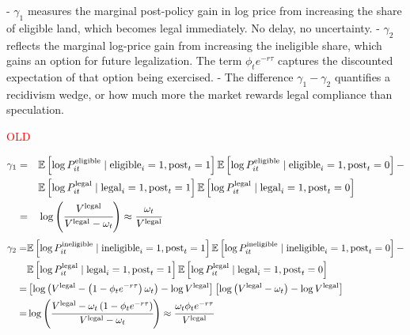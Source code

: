 \documentclass[12pt]{article}
\begin{document}
- $\gamma_1$ measures the marginal post-policy gain in log price from increasing the share of eligible land, which becomes legal immediately. No delay, no uncertainty.
- $\gamma_2$ reflects the marginal log-price gain from increasing the ineligible share, which gains an option for future legalization. The term $\phi_t e^{-r\tau}$ captures the discounted expectation of that option being exercised.
- The difference $\gamma_1 - \gamma_2$ quantifies a recidivism wedge, or how much more the market rewards legal compliance than speculation.

\clearpage

\textcolor{red}{OLD}

\begin{align*}
\gamma_1=&\quad\mathbb{E}\left[\log P_{it}^{\text{eligible}}\mid \text{eligible}_i=1,\text{post}_t=1 \right]\mathbb{E}\left[\log P_{it}^{\text{eligible}}\mid \text{eligible}_i=1,\text{post}_t=0 \right]-\\ 
&\quad \mathbb{E}\left[\log P_{it}^{\text{legal}}\mid \text{legal}_i=1,\text{post}_t=1 \right]\mathbb{E}\left[\log P_{it}^{\text{legal}}\mid \text{legal}_i=1,\text{post}_t=0 \right]\\
=&\quad\log\left(\cfrac{V^{\text{legal}}}{V^{\text{legal}}-\omega_t}\right)\approx\cfrac{\omega_t}{V^{\text{legal}}}
\end{align*}
\begin{align*}
\gamma_2=&\mathbb{E}\left[\log P_{it}^{\text{ineligible}}\mid \text{ineligible}_i=1,\text{post}_t=1 \right]\mathbb{E}\left[\log P_{it}^{\text{ineligible}}\mid \text{ineligible}_i=1,\text{post}_t=0 \right]-\\ 
&\mathbb{E}\left[\log P_{it}^{\text{legal}}\mid \text{legal}_i=1,\text{post}_t=1 \right]\mathbb{E}\left[\log P_{it}^{\text{legal}}\mid \text{legal}_i=1,\text{post}_t=0 \right]\\
=&\left[\log\left(V^{\text{legal}}-\left(1-\phi_t e^{-r\tau}\right)\omega_t\right)-\log V^{\text{legal}}\right]\left[\log\left(V^{\text{legal}}-\omega_t\right)-\log V^{\text{legal}} \right]\\
=&\log \left(\cfrac{V^{\text{legal}}-\omega_t\left(1-\phi_t e^{-r\tau}\right)}{V^{\text{legal}}-\omega_t} \right)\approx\cfrac{\omega_t\phi_te^{-r\tau}}{V^{\text{legal}}}
\end{align*}
\end{document}
